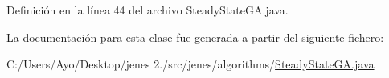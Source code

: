 Definición en la línea 44 del archivo Steady\-State\-G\-A.\-java.



La documentación para esta clase fue generada a partir del siguiente fichero\-:\begin{DoxyCompactItemize}
\item 
C\-:/\-Users/\-Ayo/\-Desktop/jenes 2./src/jenes/algorithms/\hyperlink{_steady_state_g_a_8java}{Steady\-State\-G\-A.\-java}\end{DoxyCompactItemize}
